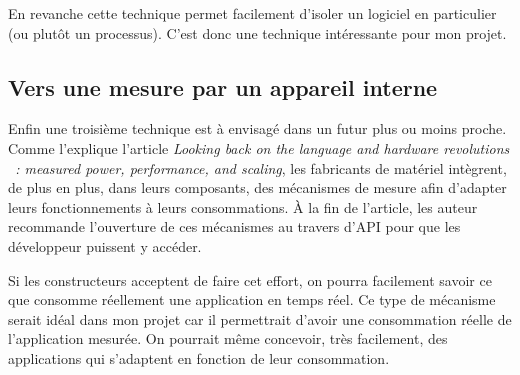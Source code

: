 \documentclass[a4paper, 11pt]{report}
\begin{document}
En revanche cette technique permet facilement d'isoler un logiciel en particulier (ou plutôt un processus). C'est donc une technique intéressante pour mon projet.

			\subsection{Vers une mesure par un appareil interne}
Enfin une troisième technique est à envisagé dans un futur plus ou moins proche. Comme l'explique l'article \textit{Looking back on the language and hardware revolutions
~: measured power, performance, and scaling}\cite{Esmaeilzadeh:2011:LBL:1950365.1950402}, les fabricants de matériel intègrent, de plus en plus, dans leurs composants, des mécanismes de mesure afin d'adapter leurs fonctionnements à leurs consommations. À la fin de l'article, les auteur recommande l'ouverture de ces mécanismes au travers d'API pour que les développeur puissent y accéder.

Si les constructeurs acceptent de faire cet effort, on pourra facilement savoir ce que consomme réellement une application en temps réel. Ce type de mécanisme serait idéal dans mon projet car il permettrait d'avoir une consommation réelle de l'application mesurée. On pourrait même concevoir, très facilement, des applications qui s'adaptent en fonction de leur consommation.



		
\end{document}
